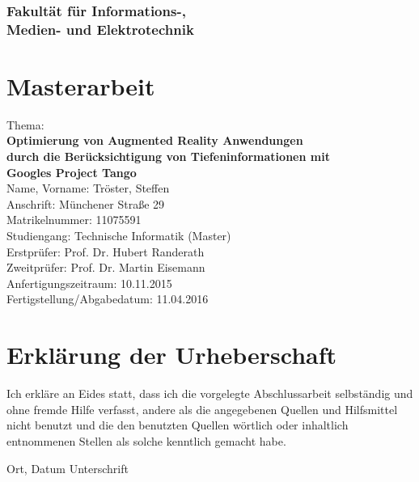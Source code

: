 
\subsubsection*{Fakultät für Informations-, \\Medien- und Elektrotechnik}

\section*{Masterarbeit}

    
Thema: \\ 
\textbf{Optimierung von Augmented Reality Anwendungen \\
durch die Berücksichtigung von Tiefeninformationen mit \\
Googles Project Tango} \\

\noindent Name, Vorname: Tröster, Steffen \\
Anschrift: Münchener Straße 29 \\
Matrikelnummer: 11075591 \\
Studiengang: Technische Informatik (Master) \\

\noindent Erstprüfer:	Prof. Dr. Hubert Randerath \\
Zweitprüfer: Prof. Dr. Martin Eisemann \\

\noindent Anfertigungszeitraum: 10.11.2015 \\
Fertigstellung/Abgabedatum: 11.04.2016 \\



\section*{Erklärung der Urheberschaft}

Ich erkläre an Eides statt, dass ich die vorgelegte Abschlussarbeit 
selbständig und ohne fremde Hilfe verfasst, andere als die angegebenen 
Quellen und Hilfsmittel nicht benutzt und die den benutzten Quellen 
wörtlich oder inhaltlich entnommenen Stellen als solche kenntlich 
gemacht habe.


\vspace{3cm}
\hspace{2cm} Ort, Datum \hfill Unterschrift \hspace{2cm}